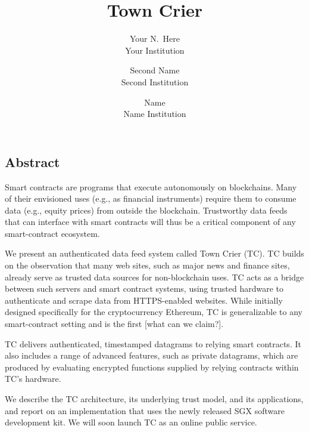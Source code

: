 \documentclass[letterpaper,twocolumn,10pt]{article}
\date{}
\title{\Large \bf Town Crier}
\author{
{\rm Your N.\ Here}\\
Your Institution
\and
{\rm Second Name}\\
Second Institution
\and
{\rm Name}\\
Name Institution
} %
\begin{document}
\maketitle


\subsection*{Abstract}
Smart contracts are programs that execute autonomously on blockchains. Many of their envisioned uses (e.g., as financial instruments) require them to consume data (e.g., equity prices) from outside the blockchain. Trustworthy data feeds that can interface with smart contracts will thus be a critical component of any smart-contract ecosystem.

	We present an authenticated data feed system called Town Crier (TC). TC builds on the observation that many web sites, such as major news and finance sites, already serve as trusted data sources for non-blockchain uses. TC acts as a bridge between such servers and smart contract systems, using trusted hardware to authenticate and scrape data from HTTPS-enabled websites. While initially designed specifically for the cryptocurrency Ethereum, TC is generalizable to any smart-contract setting and is the first [what can we claim?].
	
	TC delivers authenticated, timestamped datagrams to relying smart contracts. It also includes a range of advanced features, such as private datagrams, which are produced by evaluating encrypted functions supplied by relying contracts within TC's hardware.
	
	
	We describe the TC architecture, its underlying trust model, and its applications, and report on an implementation that uses the newly released SGX software development kit. We will soon launch TC as an online public service.
	








\end{document}
